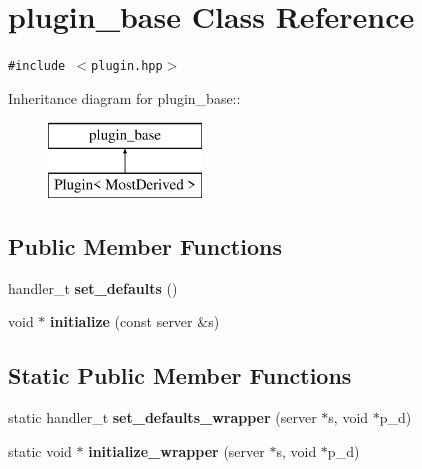 \hypertarget{classplugin__base}{
\section{plugin\_\-base Class Reference}
\label{classplugin__base}
}
{\tt \#include $<$plugin.hpp$>$}

Inheritance diagram for plugin\_\-base::\begin{figure}[H]
\begin{center}
\leavevmode
\includegraphics[height=2cm]{classplugin__base}
\end{center}
\end{figure}
\subsection*{Public Member Functions}
\begin{CompactItemize}
\item 
\hypertarget{classplugin__base_98a9f4ac48860934a8c1e96218e0cbf8}{
handler\_\-t \textbf{set\_\-defaults} ()}
\label{classplugin__base_98a9f4ac48860934a8c1e96218e0cbf8}

\item 
\hypertarget{classplugin__base_9e7d7fe3bfd0e4fac9d8cc4c88b19d06}{
void $\ast$ \textbf{initialize} (const server \&s)}
\label{classplugin__base_9e7d7fe3bfd0e4fac9d8cc4c88b19d06}

\end{CompactItemize}
\subsection*{Static Public Member Functions}
\begin{CompactItemize}
\item 
\hypertarget{classplugin__base_1fa7efbeb3925de31e1e59186658c1c0}{
static handler\_\-t \textbf{set\_\-defaults\_\-wrapper} (server $\ast$s, void $\ast$p\_\-d)}
\label{classplugin__base_1fa7efbeb3925de31e1e59186658c1c0}

\item 
\hypertarget{classplugin__base_3f93f1b89e4494a4c389115c8ef005b2}{
static void $\ast$ \textbf{initialize\_\-wrapper} (server $\ast$s, void $\ast$p\_\-d)}
\label{classplugin__base_3f93f1b89e4494a4c389115c8ef005b2}

\end{CompactItemize}
